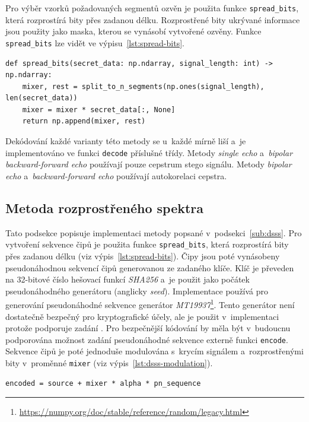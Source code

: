 Pro výběr vzorků požadovaných segmentů ozvěn je použita funkce
\texttt{spread\_bits}, která rozprostírá bity přes zadanou délku. Rozprostřené
bity ukrývané informace jsou použity jako maska, kterou se vynásobí vytvořené
ozvěny. Funkce \texttt{spread\_bits} lze vidět ve výpisu~\ref{lst:spread-bits}.

\begin{lstlisting}[language=PythonPlus, label={lst:spread-bits},
caption={Funkce pro rozprostření bitů na zadanou délku.}]
def spread_bits(secret_data: np.ndarray, signal_length: int) -> np.ndarray:
    mixer, rest = split_to_n_segments(np.ones(signal_length), len(secret_data))
    mixer = mixer * secret_data[:, None]
    return np.append(mixer, rest)
\end{lstlisting}

Dekódování každé varianty této metody se u~každé mírně liší a~je implementováno
ve funkci \texttt{decode} příslušné třídy. Metody \textit{single echo}
a~\textit{bipolar backward-forward echo} používají pouze cepstrum stego
signálu. Metody \textit{bipolar echo} a~\textit{backward-forward echo}
používají autokorelaci cepstra.

\subsection*{Metoda rozprostřeného spektra}
\label{sub:dsss-implementation}

Tato podsekce popisuje implementaci metody popsané v~podsekci~\ref{sub:dsss}.
Pro vytvoření sekvence čipů je použita funkce \texttt{spread\_bits}, která
rozprostírá bity přes zadanou délku (viz výpis~\ref{lst:spread-bits}). Čipy
jsou poté vynásobeny pseudonáhodnou sekvencí čipů generovanou ze zadaného
klíče. Klíč je převeden na 32-bitové číslo hešovací funkcí \textit{SHA256} a~je
použit jako počátek pseudonáhodného generátoru (anglicky \textit{seed}).
Implementace používá pro generování pseudonáhodné sekvence generátor
\textit{MT19937}\footnote{\url{https://numpy.org/doc/stable/reference/random/legacy.html}}.
Tento generátor není dostatečně bezpečný pro kryptografické účely, ale je
použit v~implementaci protože podporuje zadání . Pro bezpečnější
kódování by měla být v~budoucnu podporována možnost zadání pseudonáhodné
sekvence externě funkci \texttt{encode}. Sekvence čipů je poté jednoduše
modulována s~krycím signálem a~rozprostřenými bity v~proměnné \texttt{mixer}
(viz výpis~\ref{lst:dsss-modulation}).

\begin{lstlisting}[language=PythonPlus, label={lst:dsss-modulation},
caption={Modulace krycího signálu, rozprostřených bitů a~pseudonáhodné sekvence
čipů.}]
encoded = source + mixer * alpha * pn_sequence
\end{lstlisting}

